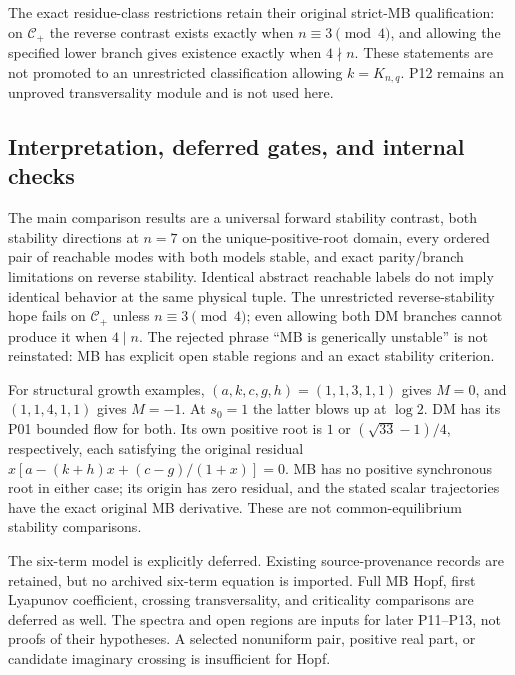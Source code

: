 The exact residue-class restrictions retain their original strict-MB
qualification: on $\mathcal C_+$ the reverse contrast exists exactly
when $n\equiv3\pmod4$, and allowing the specified lower branch gives
existence exactly when $4\nmid n$. These statements are not promoted
to an unrestricted classification allowing $k=K_{n,q}$.
P12 remains an unproved transversality module and is not used here.

\subsection{Interpretation, deferred gates, and internal checks}
\label{slot:P08-6}
The main comparison results are a universal forward stability
contrast, both stability directions at $n=7$ on the unique-positive-root
domain, every ordered pair of reachable modes with both models stable,
and exact parity/branch limitations on reverse stability. Identical
abstract reachable labels do not imply identical behavior at the same
physical tuple. The unrestricted reverse-stability hope fails on
$\mathcal C_+$ unless $n\equiv3\pmod4$; even allowing both DM
branches cannot produce it when $4\mid n$.
The rejected phrase ``MB is generically unstable'' is not reinstated:
MB has explicit open stable regions and an exact stability criterion.

For structural growth examples, $(a,k,c,g,h)=(1,1,3,1,1)$ gives
$M=0$, and $(1,1,4,1,1)$ gives $M=-1$. At $s_0=1$ the latter blows
up at $\log2$. DM has its P01 bounded flow for both. Its own positive
root is $1$ or $(\sqrt{33}-1)/4$, respectively, each satisfying the
original residual $x[a-(k+h)x+(c-g)/(1+x)]=0$.
MB has no positive synchronous root in either case; its origin has zero
residual, and the stated scalar trajectories have the exact original
MB derivative. These are not common-equilibrium stability comparisons.

\label{slot:P08-extra-1}
The six-term model is explicitly deferred. Existing source-provenance
records are retained, but no archived six-term equation is imported.
Full MB Hopf, first Lyapunov coefficient, crossing transversality, and
criticality comparisons are deferred as well. The spectra and open
regions are inputs for later P11--P13, not proofs of their hypotheses.
A selected nonuniform pair, positive real part, or candidate imaginary
crossing is insufficient for Hopf. 

